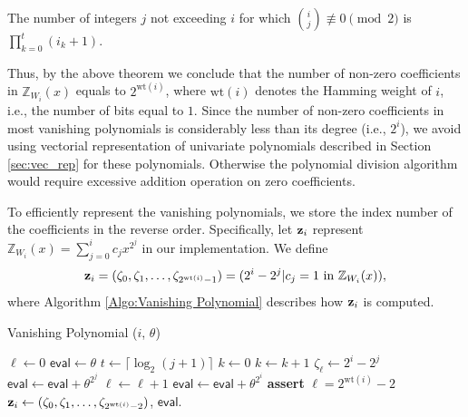 \begin{theorem}\cite[Theorem 2]{Fine1947}
	The number of integers $j$ not exceeding $i$ for which $\binom{i}{j} \not\equiv 0 \pmod{2}$ is $\prod_{k=0}^{t} (i_k + 1)$.
\end{theorem}

Thus, by the above theorem we conclude that the number of non-zero coefficients in $\mathbb{Z}_{W_{i}}(x)$ equals to $2^{\text{wt}(i)}$, where $\text{wt}(i)$ denotes the Hamming weight  of $i$, i.e., the number of bits equal to $1$. Since the number of non-zero coefficients in most vanishing polynomials is considerably less than its degree (i.e., $2^{i}$), we avoid using vectorial representation of univariate polynomials described in Section \ref{sec:vec_rep} for these polynomials. Otherwise the polynomial division algorithm would require excessive addition operation on zero coefficients.

To efficiently represent the vanishing polynomials, we store the index number of the coefficients in the reverse order. Specifically, let ${\bf{z}}_i$ represent $\mathbb{Z}_{W_{i}}(x) = \sum_{j=0}^{i} c_j x^{2^j}$ in our implementation. We define
\[
{\bf{z}}_i = (\zeta_0, \zeta_1, \ldots, \zeta_{2^{\text{wt}(i)}-1}) = (2^i-2^j | c_j=1\ \text{in}\ \mathbb{Z}_{W_{i}}(x)),
\]
where Algorithm \ref{Algo:Vanishing Polynomial} describes how ${\bf{z}}_i$ is computed.

\begin{algorithm}[h]
	\caption{Vanishing Polynomial ($i$, $\theta$)} \label{Algo:Vanishing Polynomial}
	\begin{algorithmic}[1]
	
		\State $\ell \gets 0$
		\State $\mathsf{eval} \gets \theta$
			\State $t \gets \lceil \log_2(j+1) \rceil$  
			\State	$k \gets 0$
				\State $k \gets k + 1$
			\EndWhile
				\State $\zeta_\ell \gets 2^i - 2^j$
				\State $\mathsf{eval} \gets \mathsf{eval} + \theta^{2^j}$
				\State $\ell \gets \ell + 1$ 
			\EndIf
		\EndFor
		\State $\mathsf{eval} \gets \mathsf{eval} + \theta^{2^i}$ 
		\State \textbf{assert} $\ell = 2^{\text{wt}(i)}-2$ 
		\State \Return ${\bf{z}}_i \gets (\zeta_0, \zeta_1, \ldots, \zeta_{2^{\text{wt}(i)}-2})$, $\mathsf{eval}$.
	\end{algorithmic}
\end{algorithm}

